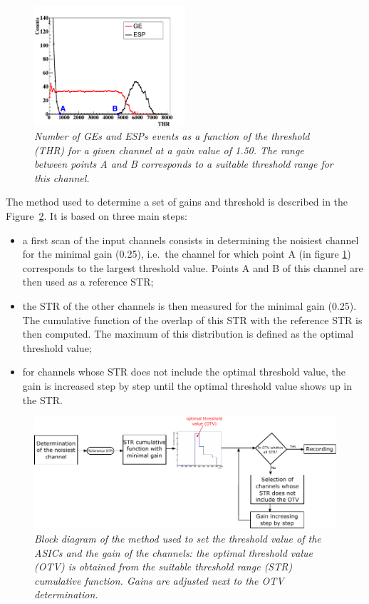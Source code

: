 \documentclass[a4paper,11pt]{article}
\begin{document}
\begin{figure}[htb]
\centering
\includegraphics[width=0.5\textwidth]{figures/S_Curve_Thr_suitable_rangeAB.pdf}
\caption{\small{\textit{Number of GEs and ESPs events as a function of the threshold (THR) for a given channel at a gain value of 1.50. The range between points A and B corresponds to a suitable threshold range for this channel.}}}
\label{fig:S_Curve}
\end{figure}

The method used to determine a set of gains and threshold is described in the Figure~\ref{fig:Simplified_algo}. It is based on three main steps:
\begin{itemize}
	\item a first scan of the input channels consists in determining the noisiest channel for the minimal gain (0.25), i.e.~the channel for which point A (in figure \ref{fig:S_Curve}) corresponds to the largest threshold value. Points A and B of this channel are then used as a reference STR;
	\item the STR of the other channels is then measured for the minimal gain (0.25). The cumulative function of the overlap of this STR with the reference STR is then computed. The maximum of this distribution is defined as the optimal threshold value;
	\item for channels whose STR does not include the optimal threshold value, the gain is increased step by step until the optimal threshold value shows up in the STR.
\end{itemize}

\begin{figure}[htb]
\centering
\includegraphics[width=\textwidth]{figures/Gains_Thr_Settings_Algo.pdf}
\caption{\small{\textit{Block diagram of the method used to set the threshold value of the ASICs and the gain of the channels: the optimal threshold value (OTV) is obtained from the suitable threshold range (STR) cumulative function. Gains are adjusted next to the OTV determination.}}}
\label{fig:Simplified_algo}
\end{figure}
\end{document}
